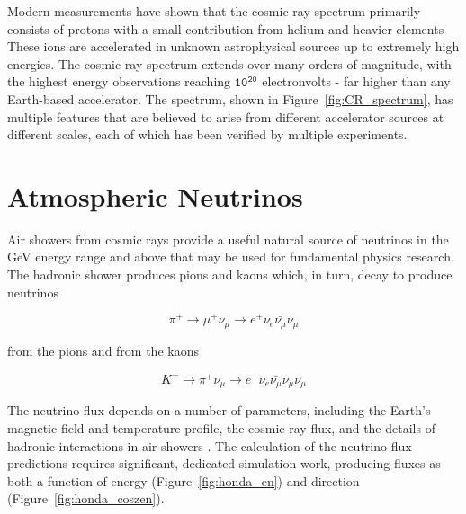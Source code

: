 Modern measurements have shown that the cosmic ray spectrum primarily consists of protons with a small contribution from helium and heavier elements \cite{PDG-2015}
These ions are accelerated in unknown astrophysical sources up to extremely high energies.
The cosmic ray spectrum extends over many orders of magnitude, with the highest energy observations reaching $\mathtt{10^{20}}$ electronvolts - far higher than any Earth-based accelerator.
The spectrum, shown in Figure~\ref{fig:CR_spectrum}, has multiple features that are believed to arise from different accelerator sources at different scales, each of which has been verified by multiple experiments.

\label{sec:atmo_nus}
\section{Atmospheric Neutrinos}
Air showers from cosmic rays provide a useful natural source of neutrinos in the GeV energy range and above that may be used for fundamental physics research.
The hadronic shower produces pions and kaons which, in turn, decay to produce neutrinos 

\begin{equation}
\pi^+ \rightarrow \mu^+ \nu_\mu \rightarrow e^+ \nu_e \bar{\nu_\mu} \nu_\mu
\end{equation}

from the pions and from the kaons

\begin{equation}
K^+ \rightarrow \pi^+ \nu_\mu \rightarrow  e^+ \nu_e \bar{\nu_\mu} \nu_\mu \nu_\mu
\end{equation}

The neutrino flux depends on a number of parameters, including the Earth's magnetic field and temperature profile, the cosmic ray flux, and the details of hadronic interactions in air showers \cite{Honda-2015}.
The calculation of the neutrino flux predictions requires significant, dedicated simulation work, producing fluxes as both a function of energy (Figure~\ref{fig:honda_en}) and direction (Figure~\ref{fig:honda_coszen}).

